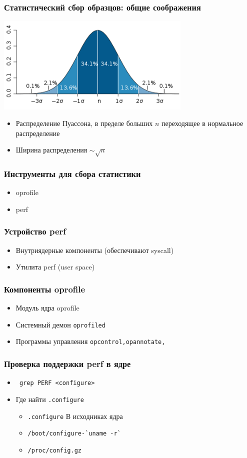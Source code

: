 \begin{frame}
 \frametitle{Статистический сбор образцов: общие соображения}
 \includegraphics[width=0.7\textwidth]{../../slides/profile/Standard_deviation_diagram.png}
 \begin{itemize}
   \item Распределение Пуассона, в пределе больших $n$ переходящее в нормальное распределение
   \item Ширина распределения $\sim \sqrt{n}$
 \end{itemize}
\end{frame}

\begin{frame}
\frametitle{Инструменты для сбора статистики}
\begin{itemize}
\item oprofile
\item perf
\end{itemize}
\end{frame}

\begin{frame}
  \frametitle{Устройство perf}
  \begin{itemize}
    \item Внутриядерные компоненты (обеспечивают syscall)
    \item Утилита perf (user space)
  \end{itemize}
\end{frame}

\begin{frame}
 \frametitle{Компоненты oprofile}
  \begin{itemize}
    \item Модуль ядра oprofile
    \item Системный демон \texttt{oprofiled}
    \item Программы управления \texttt{opcontrol,opannotate,}
  \end{itemize}
\end{frame}

\begin{frame}[fragile]
 \frametitle{Проверка поддержки perf в ядре}
 \begin{itemize}
   \item \verb+ grep PERF <configure>+
   \item Где найти \texttt{.configure}
     \begin{itemize}
      \item \texttt{.configure} В исходниках ядра
      \item \verb+/boot/configure-`uname -r`+
      \item \verb+/proc/config.gz+
     \end{itemize}
  \end{itemize}
\end{frame} 

